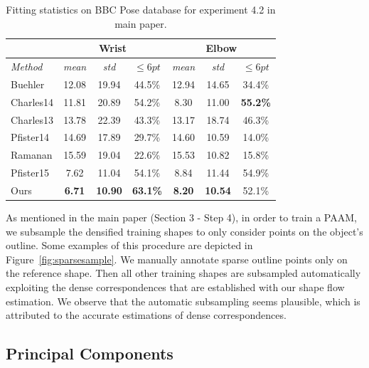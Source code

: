 \begin{table}[t!]
    \centering
    \begin{tabular}{|l|c|c|c||c|c|c|}
        \hline
                            & \multicolumn{3}{c||}{Wrist} & \multicolumn{3}{c|}{Elbow}\\
        \hline
        \emph{Method}       & \emph{mean} & \emph{std} & $\leq 6pt$ & \emph{mean} & \emph{std} & $\leq 6pt$\\
        \hline\hline
        Buehler             & 12.08    & 19.94        & 44.5\%       & 12.94    & 14.65        & 34.4\%\\
        Charles14           & 11.81    & 20.89        & 54.2\%       &  8.30    & 11.00        & \textbf{55.2\%}\\
        Charles13           & 13.78    & 22.39        & 43.3\%       & 13.17    & 18.74        & 46.3\%\\
        Pfister14           & 14.69    & 17.89        & 29.7\%       & 14.60    & 10.59        & 14.0\%\\
        Ramanan             & 15.59    & 19.04        & 22.6\%       & 15.53    & 10.82        & 15.8\%\\
        Pfister15           & 7.62     & 11.04        & 54.1\%       &  8.84    & 11.44        & 54.9\%\\
        \hline\hline
        Ours                & \textbf{6.71}& \textbf{10.90}   & \textbf{63.1\%}       & \textbf{8.20}     &  \textbf{10.54}        & 52.1\%\\
        \hline
    \end{tabular}
    \caption{Fitting statistics on BBC Pose database for experiment 4.2 in main paper.}
    \label{tab:hand_benchmark}
\end{table}

As mentioned in the main paper (Section 3 - Step 4), in order to train a PAAM, we subsample the densified training shapes to only consider points on the object's outline. Some examples of this procedure are depicted in Figure~\ref{fig:sparsesample}. We manually annotate sparse outline points only on the reference shape. Then all other training shapes are subsampled automatically exploiting the dense correspondences that are established with our shape flow estimation. We observe that the automatic subsampling seems plausible, which is attributed to the accurate estimations of dense correspondences.



\subsection{Principal Components}
\label{sec:paam_sm}




